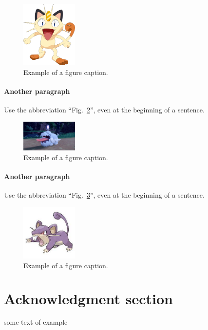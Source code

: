 \documentclass[conference]{IEEEtran}
\begin{document}
\begin{figure}[htbp]
    \centerline{\includegraphics[width=0.25\textwidth]{images/gato.png}}
    \caption{Example of a figure caption.}
    \label{figx}
\end{figure}

\paragraph{Another paragraph} Use the abbreviation
``Fig.~\ref{figy}'', even at the beginning of a sentence.
\begin{figure}[htbp]
    \centerline{\includegraphics[width=0.25\textwidth]{images/perro.jpg}}
    \caption{Example of a figure caption.}
    \label{figy}
\end{figure}

\paragraph{Another paragraph} Use the abbreviation
``Fig.~\ref{figz}'', even at the beginning of a sentence.
\begin{figure}[htbp]
    \centerline{\includegraphics[width=0.25\textwidth]{images/raton.jpg}}
    \caption{Example of a figure caption.}
    \label{figz}
\end{figure}

\section*{Acknowledgment section}
some text of example
\end{document}
